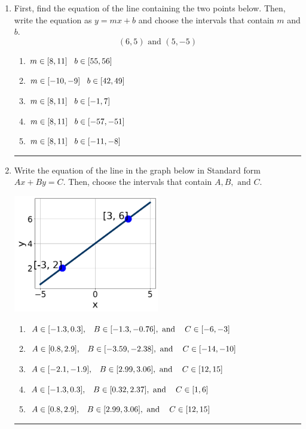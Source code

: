 \documentclass[14pt]{extbook}
\newcommand{\litem}[1]{\item#1\hspace*{-1cm}\rule{\textwidth}{0.4pt}}
\begin{document}
\begin{enumerate}
{\begin{enumerate}[label=\Alph*.]
\end{enumerate} }
\litem{
First, find the equation of the line containing the two points below. Then, write the equation as $ y=mx+b $ and choose the intervals that contain $m$ and $b$.\[ (6, 5) \text{ and } (5, -5) \]\begin{enumerate}[label=\Alph*.]
\item \( m \in [8, 11] \hspace*{3mm} b \in [55, 56] \)
\item \( m \in [-10, -9] \hspace*{3mm} b \in [42, 49] \)
\item \( m \in [8, 11] \hspace*{3mm} b \in [-1, 7] \)
\item \( m \in [8, 11] \hspace*{3mm} b \in [-57, -51] \)
\item \( m \in [8, 11] \hspace*{3mm} b \in [-11, -8] \)

\end{enumerate} }
\litem{
Write the equation of the line in the graph below in Standard form $Ax+By=C$. Then, choose the intervals that contain $A, B, \text{ and } C$.
\begin{center}
    \includegraphics[width=0.5\textwidth]{../Figures/linearGraphToStandardB.png}
\end{center}
\begin{enumerate}[label=\Alph*.]
\item \( A \in [-1.3, 0.3], \hspace{3mm} B \in [-1.3, -0.76], \text{ and } \hspace{3mm} C \in [-6, -3] \)
\item \( A \in [0.8, 2.9], \hspace{3mm} B \in [-3.59, -2.38], \text{ and } \hspace{3mm} C \in [-14, -10] \)
\item \( A \in [-2.1, -1.9], \hspace{3mm} B \in [2.99, 3.06], \text{ and } \hspace{3mm} C \in [12, 15] \)
\item \( A \in [-1.3, 0.3], \hspace{3mm} B \in [0.32, 2.37], \text{ and } \hspace{3mm} C \in [1, 6] \)
\item \( A \in [0.8, 2.9], \hspace{3mm} B \in [2.99, 3.06], \text{ and } \hspace{3mm} C \in [12, 15] \)


\end{enumerate}}
\end{enumerate}
\end{document}

